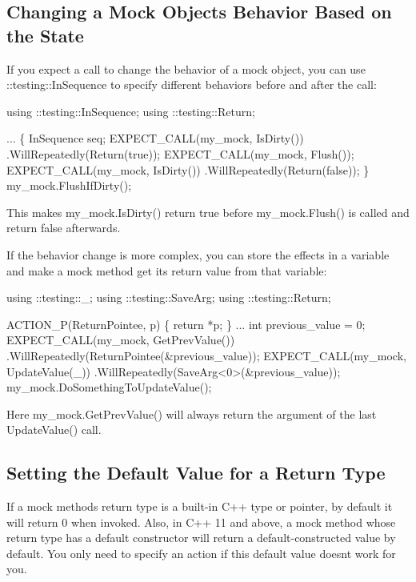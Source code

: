 \subsection*{Changing a Mock Object\textquotesingle{}s Behavior Based on the State}

If you expect a call to change the behavior of a mock object, you can use {\ttfamily \+::testing\+::\+In\+Sequence} to specify different behaviors before and after the call\+:


\begin{DoxyCode}
using ::testing::InSequence;
using ::testing::Return;

...
  \{
    InSequence seq;
    EXPECT\_CALL(my\_mock, IsDirty())
        .WillRepeatedly(Return(\textcolor{keyword}{true}));
    EXPECT\_CALL(my\_mock, Flush());
    EXPECT\_CALL(my\_mock, IsDirty())
        .WillRepeatedly(Return(\textcolor{keyword}{false}));
  \}
  my\_mock.FlushIfDirty();
\end{DoxyCode}


This makes {\ttfamily my\+\_\+mock.\+Is\+Dirty()} return {\ttfamily true} before {\ttfamily my\+\_\+mock.\+Flush()} is called and return {\ttfamily false} afterwards.

If the behavior change is more complex, you can store the effects in a variable and make a mock method get its return value from that variable\+:


\begin{DoxyCode}
using ::testing::\_;
using ::testing::SaveArg;
using ::testing::Return;

ACTION\_P(ReturnPointee, p) \{ \textcolor{keywordflow}{return} *p; \}
...
  \textcolor{keywordtype}{int} previous\_value = 0;
  EXPECT\_CALL(my\_mock, GetPrevValue())
      .WillRepeatedly(ReturnPointee(&previous\_value));
  EXPECT\_CALL(my\_mock, UpdateValue(\_))
      .WillRepeatedly(SaveArg<0>(&previous\_value));
  my\_mock.DoSomethingToUpdateValue();
\end{DoxyCode}


Here {\ttfamily my\+\_\+mock.\+Get\+Prev\+Value()} will always return the argument of the last {\ttfamily Update\+Value()} call.

\subsection*{Setting the Default Value for a Return Type}

If a mock method\textquotesingle{}s return type is a built-\/in C++ type or pointer, by default it will return 0 when invoked. Also, in C++ 11 and above, a mock method whose return type has a default constructor will return a default-\/constructed value by default. You only need to specify an action if this default value doesn\textquotesingle{}t work for you.

